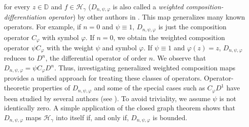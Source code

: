\documentclass[12pt, reqno]{amsart}
\theoremstyle{definition}
\theoremstyle{remark}
\numberwithin{equation}{section}
\begin{document}
for every $z\in \mathbb{D}$ and $f\in\mathcal{H}_\gamma$ ($D_{n, \psi, \varphi}$ is also called a {\it weighted composition-differentiation  operator}) by other authors in \cite{Fatehi_Hammond_CAOT_2021, Han_Wang_JMAA_2021,Han_Wang_CAOT_2021}. This map generalizes many known operators. For example, if $n=0$ and $\psi \equiv 1$, $D_{n, \psi, \varphi}$ is just the composition operator $C_\varphi$ with symbol $\varphi$. If $n=0$, we obtain the weighted composition operator $\psi C_\varphi$ with the weight $\psi$ and symbol $\varphi$. If $\psi \equiv 1$ and $\varphi(z)=z$,  $ D_{n, \psi, \varphi}$ reduces to $D^n$, the differential operator of order $n$. We observe that $ D_{n, \psi, \varphi}=\psi C_\varphi D^n$. Thus, investigating generalized weighted composition maps provides a unified approach for treating these classes of operators. Operator-theoretic properties of  $D_{n, \psi, \varphi}$ and some of the special cases such as $C_\varphi D^1$ have been studied by several authors (see \cite{Datt_Jain_Ohri_Filomat_2020, Fatehi_Hammond_PAMS_2020, Hibschweiler_Portnoy_Rocky_2005, Ohno_BAMS_2006, Stević_BBMS_2009, Zhu_NFAO_2009}). To avoid triviality, we assume $\psi$ is not identically zero. A simple application of the closed graph theorem shows that $ D_{n, \psi, \varphi}$ maps $\mathcal{H}_\gamma$ into itself if, and only if,  $D_{n, \psi, \varphi}$ is bounded.   
\end{document}
